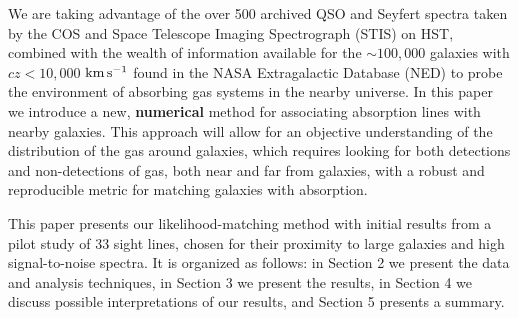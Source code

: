 \documentclass[twocolumn,tighten]{aastex6}
\begin{document}
We are taking advantage of the over 500 archived QSO and Seyfert spectra taken by the COS and Space Telescope Imaging Spectrograph (STIS) on HST, combined with the wealth of information available for the $\sim100,000$ galaxies with $cz<10,000$ $\rm km\, s^{-1}$ found in the NASA Extragalactic Database (NED) to probe the environment of absorbing gas systems in the nearby universe. In this paper we introduce a new, \textbf{numerical} method for associating absorption lines with nearby galaxies. This approach will allow for an objective understanding of the distribution of the gas around galaxies, which requires looking for both detections and non-detections of gas, both near and far from galaxies, with a robust and reproducible metric for matching galaxies with absorption.

This paper presents our likelihood-matching method with initial results from a pilot study of 33 sight lines, chosen for their proximity to large galaxies and high signal-to-noise spectra. It is organized as follows: in Section 2 we present the data and analysis techniques, in Section 3 we present the results, in Section 4 we discuss possible interpretations of our results, and Section 5 presents a summary.
\end{document}
